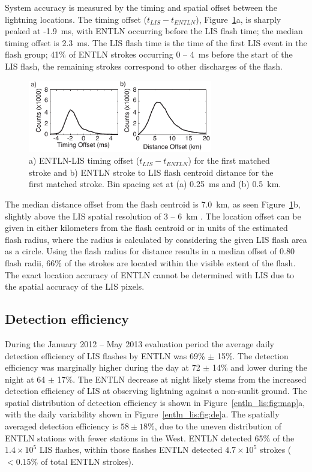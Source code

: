 System accuracy is measured by the timing and spatial offset between the lightning locations.
The timing offset ($t_{LIS} - t_{ENTLN}$), Figure~\ref{entln_lis:fig:accuracy}a, is sharply peaked at -1.9~ms, with ENTLN occurring before the LIS flash time; the median timing offset is 2.3~ms.
The LIS flash time is the time of the first LIS event in the flash group; 41\% of ENTLN strokes occurring 0 -- 4~ms before the start of the LIS flash, the remaining strokes correspond to other discharges of the flash.

\begin{figure}[t]
   \centering
   \noindent\includegraphics[width=19pc,angle=0]{entln_lis/Figures/accuracy.pdf}
   \caption{a) ENTLN-LIS timing offset ($t_{LIS} - t_{ENTLN}$) for the first matched stroke and
   		b) ENTLN stroke to LIS flash centroid distance for the first matched stroke.
   		Bin spacing set at (a) 0.25~ms and (b) 0.5~km.}
   \label{entln_lis:fig:accuracy}
\end{figure}

The median distance offset from the flash centroid is 7.0~km, as seen Figure~\ref{entln_lis:fig:accuracy}b, slightly above the LIS spatial resolution of 3 -- 6~km \citep{Christian1999}.
The location offset can be given in either kilometers from the flash centroid or in units of the estimated flash radius, where the radius is calculated by considering the given LIS flash area as a circle.
Using the flash radius for distance results in a median offset of 0.80 flash radii, 66\% of the strokes are located within the visible extent of the flash.
The exact location accuracy of ENTLN cannot be determined with LIS due to the spatial accuracy of the LIS pixels.

\subsection{Detection efficiency}

During the January 2012 -- May 2013 evaluation period the average daily detection efficiency of LIS flashes by ENTLN was 69\% $\pm$ 15\%.
The detection efficiency was marginally higher during the day at 72 $\pm$ 14\% and lower during the night at 64 $\pm$ 17\%.
The ENTLN decrease at night likely stems from the increased detection efficiency of LIS at observing lightning against a non-sunlit ground.
The spatial distribution of detection efficiency is shown in Figure~\ref{entln_lis:fig:map}a, with the daily variability shown in Figure~\ref{entln_lis:fig:de}a.
The spatially averaged detection efficiency is $58 \pm 18$\%, due to the uneven distribution of ENTLN stations with fewer stations in the West.
ENTLN detected 65\% of the $1.4\times10^5$ LIS flashes, within those flashes ENTLN detected $4.7\times10^5$ strokes ($<0.15$\% of total ENTLN strokes).

